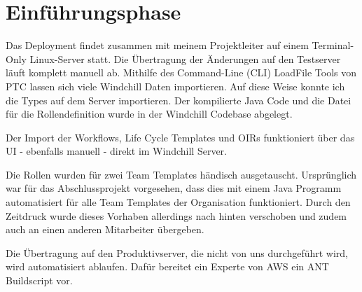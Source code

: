 \section{Einführungsphase}
\label{sec:Einfuehrungsphase}

Das Deployment findet zusammen mit meinem Projektleiter auf einem Terminal-Only Linux-Server statt.
Die Übertragung der Änderungen auf den Testserver läuft komplett manuell ab.
Mithilfe des Command-Line (CLI) LoadFile Tools von PTC lassen sich viele Windchill Daten importieren.
Auf diese Weise konnte ich die Types auf dem Server importieren.
Der kompilierte Java Code und die Datei für die Rollendefinition wurde in der Windchill Codebase abgelegt.

Der Import der Workflows, Life Cycle Templates und OIRs funktioniert über das UI - ebenfalls manuell - direkt im Windchill Server.

Die Rollen wurden für zwei Team Templates händisch ausgetauscht.
Ursprünglich war für das Abschlussprojekt vorgesehen, dass dies mit einem Java Programm automatisiert für alle Team Templates der Organisation funktioniert.
Durch den Zeitdruck wurde dieses Vorhaben allerdings nach hinten verschoben und zudem auch an einen anderen Mitarbeiter übergeben.

Die Übertragung auf den Produktivserver, die nicht von uns durchgeführt wird, wird automatisiert ablaufen.
Dafür bereitet ein Experte von AWS ein ANT Buildscript vor.

